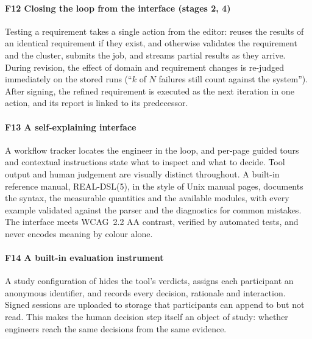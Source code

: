 \paragraph*{F12 Closing the loop from the interface (stages 2, 4)} Testing a
requirement takes a single action from the editor: \tool{} reuses the results
of an identical requirement if they exist, and otherwise validates the
requirement and the cluster, submits the job, and streams partial results as
they arrive. During revision, the effect of domain and requirement changes is
re-judged immediately on the stored runs (``$k$ of $N$ failures still count
against the system''). After signing, the refined requirement is executed as
the next iteration in one action, and its report is linked to its
predecessor.

\paragraph*{F13 A self-explaining interface} A workflow tracker locates the
engineer in the loop, and per-page guided tours and contextual instructions
state what to inspect and what to decide. Tool output and human judgement are
visually distinct throughout. A built-in reference manual, REAL-DSL(5), in the
style of Unix manual pages, documents the syntax, the measurable quantities and
the available modules, with every example validated against the parser and the
diagnostics for common mistakes. The interface meets WCAG~2.2 AA contrast,
verified by automated tests, and never encodes meaning by colour alone.

\paragraph*{F14 A built-in evaluation instrument} A study configuration of
\tool{} hides the tool's verdicts, assigns each participant an anonymous
identifier, and records every decision, rationale and interaction. Signed
sessions are uploaded to storage that participants can append to but not read.
This makes the human decision step itself an object of study: whether
engineers reach the same decisions from the same evidence.
